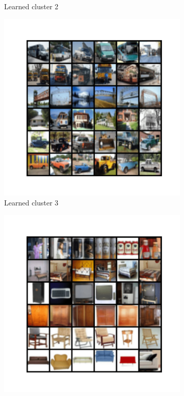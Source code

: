 \documentclass[10pt,twocolumn,letterpaper]{article}
\begin{document}
\begin{figure}
\begin{subfigure}{0.32\textwidth}
       \caption{Learned cluster 2}
     \end{subfigure}
     \hfill
     \begin{subfigure}{0.32\textwidth}
       \includegraphics[width=\linewidth,trim={1cm 2cm 1cm 2cm},clip]{figures/experiments/cifar100_cluster/nearest_class2.png}
       \caption{Learned cluster 3}
     \end{subfigure} 
     \hfill
     \begin{subfigure}{0.32\textwidth}
       \includegraphics[width=\linewidth,trim={1cm 2cm 1cm 2cm},clip]{figures/experiments/cifar100_cluster/nearest_class3.png}

\end{subfigure}
\end{figure}
\end{document}
